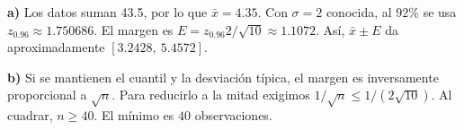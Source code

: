 \textbf{a)} Los datos suman 43.5, por lo que $\bar x=4.35$.
Con $\sigma=2$ conocida, al $92\%$ se usa $z_{0.96}\approx1.750686$.
El margen es $E=z_{0.96}2/\sqrt{10}\approx\boxed{1.1072}$.
Así, $\bar x\pm E$ da aproximadamente $\boxed{[3.2428,\ 5.4572]}$.

\textbf{b)} Si se mantienen el cuantil y la desviación típica,
el margen es inversamente proporcional a $\sqrt n$. Para
reducirlo a la mitad exigimos $1/\sqrt n\le1/(2\sqrt{10})$.
Al cuadrar, $n\ge40$. El mínimo es $\boxed{40}$ observaciones.
